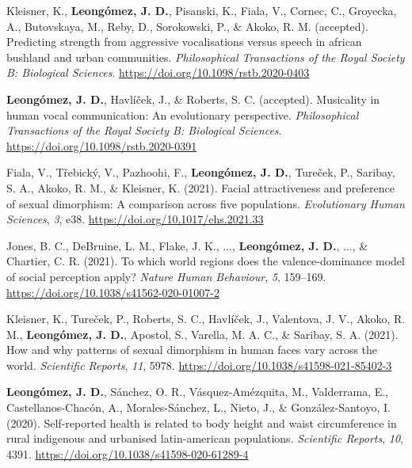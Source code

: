 \documentclass[11pt, a4paper]{awesome-cv}
\begin{document}
\hypertarget{refs_journals}{}
\leavevmode\hypertarget{ref-kleisnerHearMeRoar2021}{}%
Kleisner, K., \textbf{Leongómez, J. D.}, Pisanski, K., Fiala, V.,
Cornec, C., Groyecka, A., Butovskaya, M., Reby, D., Sorokowski, P., \&
Akoko, R. M. (accepted). Predicting strength from aggressive
vocalisations versus speech in african bushland and urban communities.
\emph{Philosophical Transactions of the Royal Society B: Biological
Sciences}. \url{https://doi.org/10.1098/rstb.2020-0403}

\leavevmode\hypertarget{ref-leongomezMusicalityHumanVocal2021}{}%
\textbf{Leongómez, J. D.}, Havlíček, J., \& Roberts, S. C. (accepted).
Musicality in human vocal communication: {An} evolutionary perspective.
\emph{Philosophical Transactions of the Royal Society B: Biological
Sciences}. \url{https://doi.org/10.1098/rstb.2020-0391}

\leavevmode\hypertarget{ref-fialaFacialAttractivenessPreference2021}{}%
Fiala, V., Třebický, V., Pazhoohi, F., \textbf{Leongómez, J. D.},
Tureček, P., Saribay, S. A., Akoko, R. M., \& Kleisner, K. (2021).
Facial attractiveness and preference of sexual dimorphism: A comparison
across five populations. \emph{Evolutionary Human Sciences}, \emph{3},
e38. \url{https://doi.org/10.1017/ehs.2021.33}

\leavevmode\hypertarget{ref-Jones2021}{}%
Jones, B. C., DeBruine, L. M., Flake, J. K., ...,
\textbf{Leongómez, J. D.}, ..., \& Chartier, C. R. (2021). {To which
world regions does the valence-dominance model of social perception
apply?} \emph{Nature Human Behaviour}, \emph{5}, 159--169.
\url{https://doi.org/10.1038/s41562-020-01007-2}

\leavevmode\hypertarget{ref-kleisner2021}{}%
Kleisner, K., Tureček, P., Roberts, S. C., Havlíček, J., Valentova, J.
V., Akoko, R. M., \textbf{Leongómez, J. D.}, Apostol, S., Varella, M. A.
C., \& Saribay, S. A. (2021). How and why patterns of sexual dimorphism
in human faces vary across the world. \emph{Scientific Reports},
\emph{11}, 5978. \url{https://doi.org/10.1038/s41598-021-85402-3}

\leavevmode\hypertarget{ref-Leonguxf3mez2020}{}%
\textbf{Leongómez, J. D.}, Sánchez, O. R., Vásquez-Amézquita, M.,
Valderrama, E., Castellanos-Chacón, A., Morales-Sánchez, L., Nieto, J.,
\& González-Santoyo, I. (2020). Self-reported health is related to body
height and waist circumference in rural indigenous and urbanised
latin-american populations. \emph{Scientific Reports}, \emph{10}, 4391.
\url{https://doi.org/10.1038/s41598-020-61289-4}
\end{document}
